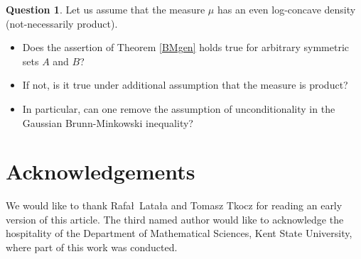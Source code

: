 \documentclass[11pt]{article}
\newcommand{\1}{\mathbf{{1}}}
\theoremstyle{definition}
\newtheorem*{que*}{Question}
\begin{document}
\begin{que*}
Let us assume that the measure $\mu$ has an even log-concave density (not-necessarily product).
\begin{itemize}
\item Does the assertion of Theorem \ref{BMgen} holds true for arbitrary symmetric sets $A$ and $B$?
\item If not, is it true under additional assumption that the measure is product? \item  In particular, can one remove the assumption of unconditionality in the Gaussian Brunn-Minkowski inequality?
\end{itemize}
\end{que*}


\section*{Acknowledgements}

We would like to thank Rafa\l \ Lata\l a and Tomasz Tkocz for reading an early version of this article. The third named author would like to acknowledge the hospitality of the Department of Mathematical Sciences, Kent State University, where part of this work was conducted.
\end{document}

